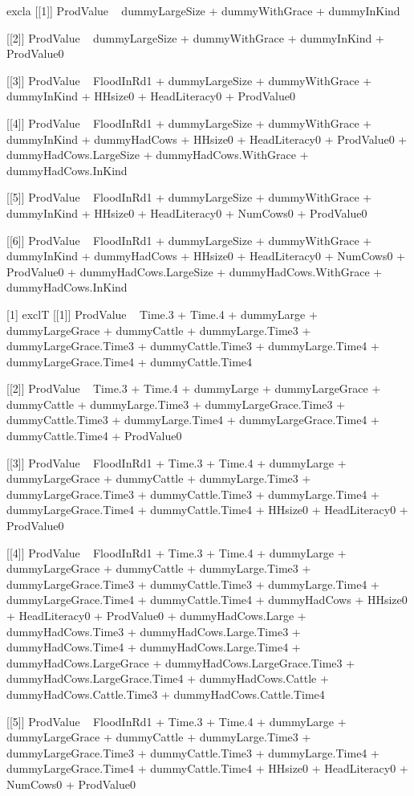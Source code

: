 \begin{Schunk}
\begin{Soutput}
[1] excla
[[1]]
ProdValue ~ dummyLargeSize + dummyWithGrace + dummyInKind

[[2]]
ProdValue ~ dummyLargeSize + dummyWithGrace + dummyInKind + ProdValue0

[[3]]
ProdValue ~ FloodInRd1 + dummyLargeSize + dummyWithGrace + dummyInKind + 
    HHsize0 + HeadLiteracy0 + ProdValue0

[[4]]
ProdValue ~ FloodInRd1 + dummyLargeSize + dummyWithGrace + dummyInKind + 
    dummyHadCows + HHsize0 + HeadLiteracy0 + ProdValue0 + dummyHadCows.LargeSize + 
    dummyHadCows.WithGrace + dummyHadCows.InKind

[[5]]
ProdValue ~ FloodInRd1 + dummyLargeSize + dummyWithGrace + dummyInKind + 
    HHsize0 + HeadLiteracy0 + NumCows0 + ProdValue0

[[6]]
ProdValue ~ FloodInRd1 + dummyLargeSize + dummyWithGrace + dummyInKind + 
    dummyHadCows + HHsize0 + HeadLiteracy0 + NumCows0 + ProdValue0 + 
    dummyHadCows.LargeSize + dummyHadCows.WithGrace + dummyHadCows.InKind

[1] exclT
[[1]]
ProdValue ~ Time.3 + Time.4 + dummyLarge + dummyLargeGrace + 
    dummyCattle + dummyLarge.Time3 + dummyLargeGrace.Time3 + 
    dummyCattle.Time3 + dummyLarge.Time4 + dummyLargeGrace.Time4 + 
    dummyCattle.Time4

[[2]]
ProdValue ~ Time.3 + Time.4 + dummyLarge + dummyLargeGrace + 
    dummyCattle + dummyLarge.Time3 + dummyLargeGrace.Time3 + 
    dummyCattle.Time3 + dummyLarge.Time4 + dummyLargeGrace.Time4 + 
    dummyCattle.Time4 + ProdValue0

[[3]]
ProdValue ~ FloodInRd1 + Time.3 + Time.4 + dummyLarge + dummyLargeGrace + 
    dummyCattle + dummyLarge.Time3 + dummyLargeGrace.Time3 + 
    dummyCattle.Time3 + dummyLarge.Time4 + dummyLargeGrace.Time4 + 
    dummyCattle.Time4 + HHsize0 + HeadLiteracy0 + ProdValue0

[[4]]
ProdValue ~ FloodInRd1 + Time.3 + Time.4 + dummyLarge + dummyLargeGrace + 
    dummyCattle + dummyLarge.Time3 + dummyLargeGrace.Time3 + 
    dummyCattle.Time3 + dummyLarge.Time4 + dummyLargeGrace.Time4 + 
    dummyCattle.Time4 + dummyHadCows + HHsize0 + HeadLiteracy0 + 
    ProdValue0 + dummyHadCows.Large + dummyHadCows.Time3 + dummyHadCows.Large.Time3 + 
    dummyHadCows.Time4 + dummyHadCows.Large.Time4 + dummyHadCows.LargeGrace + 
    dummyHadCows.LargeGrace.Time3 + dummyHadCows.LargeGrace.Time4 + 
    dummyHadCows.Cattle + dummyHadCows.Cattle.Time3 + dummyHadCows.Cattle.Time4

[[5]]
ProdValue ~ FloodInRd1 + Time.3 + Time.4 + dummyLarge + dummyLargeGrace + 
    dummyCattle + dummyLarge.Time3 + dummyLargeGrace.Time3 + 
    dummyCattle.Time3 + dummyLarge.Time4 + dummyLargeGrace.Time4 + 
    dummyCattle.Time4 + HHsize0 + HeadLiteracy0 + NumCows0 + 
    ProdValue0


\end{Soutput}
\end{Schunk}
